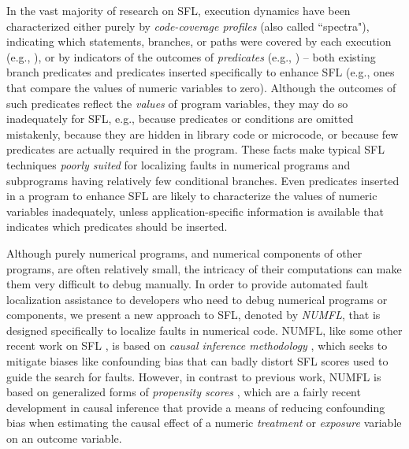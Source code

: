 In the vast majority of research on SFL, execution dynamics have been characterized either purely by {\it code-coverage profiles} (also called ``spectra"), indicating which statements, branches, or paths were covered by each execution (e.g., \cite{Jones2002}), or by indicators of the outcomes of {\it predicates} (e.g., \cite{Liblit2004}) – both existing branch predicates and predicates inserted specifically to enhance SFL (e.g., ones that compare the values of numeric variables to zero).  Although the outcomes of such predicates reflect the {\it values} of program variables, they may do so inadequately for SFL, e.g., because predicates or conditions are omitted mistakenly, because they are hidden in library code or microcode, or because few predicates are actually required in the program.  These facts make typical SFL techniques {\it poorly suited} for localizing faults in numerical programs and subprograms having relatively few conditional branches.  Even predicates inserted in a program to enhance SFL are likely to characterize the values of numeric variables inadequately, unless application-specific information is available that indicates which predicates should be inserted.

Although purely numerical programs, and numerical components of other programs, are often relatively small, the intricacy of their computations can make them very difficult to debug manually.  In order to provide automated fault localization assistance to developers who need to debug numerical programs or components, we present a new approach to SFL, denoted by {\it NUMFL}, that is designed specifically to localize faults in numerical code.  NUMFL, like some other recent work on SFL \cite{Baah2010,Baah2011, Gore2012,Shu2013}, is based on {\it causal inference methodology} \cite{Pearl2003}, which seeks to mitigate biases like confounding bias that can badly distort SFL scores used to guide the search for faults.  However, in contrast to previous work, NUMFL is based on generalized forms of {\it propensity scores} \cite{Imai2004,Imai2014}, which are a fairly recent development in causal inference that provide a means of reducing confounding bias when estimating the causal effect of a numeric {\it treatment} or {\it exposure} variable on an outcome variable.


